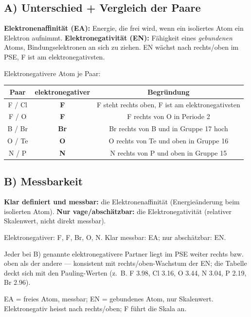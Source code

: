 
\subsection*{A) Unterschied + Vergleich der Paare}
\textbf{Elektronenaffinität (EA):} Energie, die frei wird, wenn ein isoliertes
Atom ein Elektron aufnimmt. \textbf{Elektronegativität (EN):} Fähigkeit eines
\textit{gebundenen} Atoms, Bindungselektronen an sich zu ziehen.
EN wächst nach rechts/oben im PSE, F ist am elektronegativsten.

Elektronegativere Atom je Paar:
\begin{center}
\begin{tabular}{c c c}
Paar & elektronegativer & Begründung \\
\hline
F / Cl      & \textbf{F}  & F steht rechts oben, F ist am elektronegativsten \\
F / O       & \textbf{F}  & F rechts von O in Periode 2 \\
B / Br      & \textbf{Br} & Br rechts von B und in Gruppe 17 hoch \\
O / Te      & \textbf{O}  & O rechts von Te und oben in Gruppe 16 \\
N / P       & \textbf{N}  & N rechts von P und oben in Gruppe 15 \\
\end{tabular}
\end{center}

\subsection*{B) Messbarkeit}
\textbf{Klar definiert und messbar:} die Elektronenaffinität (Energieänderung beim
isolierten Atom). \textbf{Nur vage/abschätzbar:} die Elektronegativität (relativer
Skalenwert, nicht direkt messbar).

\begin{ergebnis}
Elektronegativer: F, F, Br, O, N. Klar messbar: EA; nur abschätzbar: EN.
\end{ergebnis}

\begin{kontrolle}
Jeder bei B) genannte elektronegativere Partner liegt im PSE weiter rechts
bzw. oben als der andere --- konsistent mit rechts/oben-Wachstum der EN; die
Tabelle deckt sich mit den Pauling-Werten (z.\ B. F 3.98, Cl 3.16, O 3.44,
N 3.04, P 2.19, Br 2.96).
\end{kontrolle}

\begin{merksatz}
EA = freies Atom, messbar; EN = gebundenes Atom, nur Skalenwert. Elektronegativ
heisst nach rechts/oben; F führt die Skala an.
\end{merksatz}
